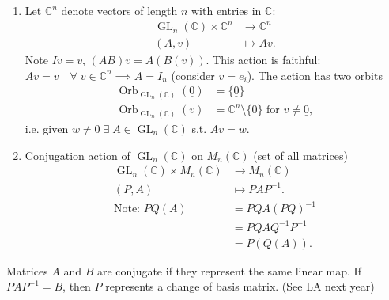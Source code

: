 \begin{enumerate}
    \item Let $\mathbb{C}^n$ denote vectors of length $n$ with entries in $\mathbb{C}$:
    \begin{align*}
        \operatorname{GL}_n(\mathbb{C}) \times \mathbb{C}^n &\to \mathbb{C}^n \\
        (A, v) &\mapsto Av.
    \end{align*} 
    Note $Iv = v$, $(AB)v = A(B(v))$.
    This action is faithful: $Av = v \quad \forall \; v \in \mathbb{C}^n \implies A = I_n$ (consider $v = e_i$).
    The action has two orbits
    \begin{align*}
        \operatorname{Orb}_{\operatorname{GL}_n(\mathbb{C})}(\underline{0}) &= \{\underline{0}\} \\
        \operatorname{Orb}_{\operatorname{GL}_n(\mathbb{C})}(v) &= \mathbb{C}^n \setminus \{0\} \text{ for } v \neq \underline{0},
    \end{align*} i.e. given $w \neq 0 \; \exists \; A \in \operatorname{GL}_n(\mathbb{C})$ s.t. $Av = w$.
    \item Conjugation action of $\operatorname{GL}_n(\mathbb{C})$ on $M_n(\mathbb{C})$ (set of all matrices)
    \begin{align*}
        \operatorname{GL}_n(\mathbb{C}) \times M_n(\mathbb{C}) &\to M_n(\mathbb{C}) \\
        (P, A) &\mapsto P A P^{-1}. \\
    \text{Note: } PQ(A) &= PQ A (PQ)^{-1} \\
        &= PQ A Q^{-1} P^{-1} \\
        &= P(Q(A)).
    \end{align*} 
\end{enumerate} 

\begin{remark}
    Matrices $A$ and $B$ are conjugate if they represent the same linear map. 
    If $PAP^{-1} = B$, then $P$ represents a change of basis matrix. (See LA next year)
\end{remark} 

